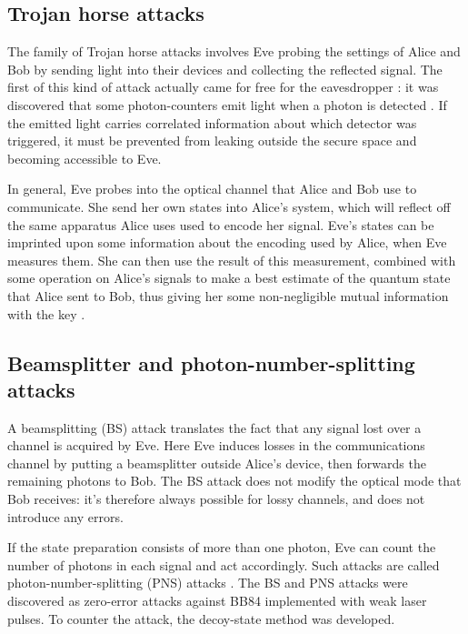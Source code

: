 \subsection{Trojan horse attacks}

The family of Trojan horse attacks involves Eve probing the settings of Alice and Bob by sending light into their devices and collecting the reflected signal. The first of this kind of attack actually came for free for the eavesdropper \cite{bib:RevModPhys.81.1301}: it was discovered that some photon-counters emit light when a photon is detected \cite{bib:kurtsiefer2001breakdown}. If the emitted light carries correlated information about which detector was triggered, it must be prevented from leaking outside the secure space and becoming accessible to Eve.

In general, Eve probes into the optical channel that Alice and Bob use to communicate. She send her own states into Alice's system, which will reflect off the same apparatus Alice uses used to encode her signal. Eve's states can be imprinted upon some information about the encoding used by Alice, when Eve measures them. She can then use the result of this measurement, combined with some operation on Alice's signals to make a best estimate of the quantum state that Alice sent to Bob, thus giving her some non-negligible mutual information with the key \cite{bib:PhysRevA.97.042335}.


\subsection{Beamsplitter and photon-number-splitting attacks}

A beamsplitting (BS) attack translates the fact that any signal lost over a channel is acquired by Eve. Here Eve induces losses in the communications channel by putting a beamsplitter outside Alice's device, then forwards the remaining photons to Bob. The BS attack does not modify the optical mode that Bob receives: it's therefore always possible for lossy channels, and does not introduce any errors.

If the state preparation consists of more than one photon, Eve can count the number of photons in each signal and act accordingly. Such attacks are called photon-number-splitting (PNS) attacks \cite{bib:PhysRevLett.68.3121}. The BS and PNS attacks were discovered as zero-error attacks against BB84 implemented with weak laser pulses. To counter the attack, the decoy-state method \cite{bib:PhysRevLett.91.057901, bib:PhysRevLett.94.230504} was developed.

